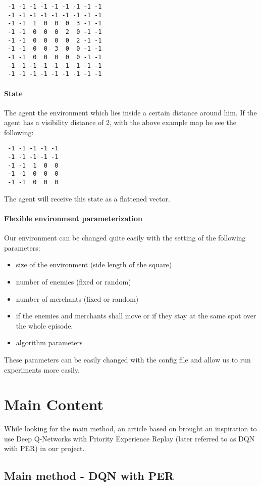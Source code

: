 \documentclass[a4paper,11pt]{article}
\theoremstyle{definition}
\begin{document}
\begin{verbatim}
 -1 -1 -1 -1 -1 -1 -1 -1 -1
 -1 -1 -1 -1 -1 -1 -1 -1 -1
 -1 -1  1  0  0  0  3 -1 -1
 -1 -1  0  0  0  2  0 -1 -1
 -1 -1  0  0  0  0  2 -1 -1
 -1 -1  0  0  3  0  0 -1 -1
 -1 -1  0  0  0  0  0 -1 -1
 -1 -1 -1 -1 -1 -1 -1 -1 -1
 -1 -1 -1 -1 -1 -1 -1 -1 -1
\end{verbatim}

\paragraph{State}
\label{sec:state}
The agent  the environment which lies inside a certain distance around him. If the agent has a visibility distance of 2, with the above example map he see the following:
 \begin{verbatim}
 -1 -1 -1 -1 -1 
 -1 -1 -1 -1 -1 
 -1 -1  1  0  0 
 -1 -1  0  0  0  
 -1 -1  0  0  0 
\end{verbatim}
The agent will receive this state as a flattened vector.

\paragraph{Flexible environment parameterization} 
Our environment can be changed quite easily with the setting of the following parameters:
\begin{itemize}
	\item size of the environment (side length of the square) 
	\item number of enemies (fixed or random)
	\item number of merchants (fixed or random)
	\item if the enemies and merchants shall move or if they stay at the same spot over the whole episode.
	\item algorithm parameters 
\end{itemize}
These parameters can be easily changed with the config file and allow us to run experiments more easily. 

\section{Main Content}
While looking for the main method, an article \cite{crabe_2020} based on \cite{schaul_2016} brought an inspiration to use Deep Q-Networks with Priority Experience Replay (later referred to as DQN with PER) in our project. 

\subsection{Main method - DQN with PER}
\end{document}
